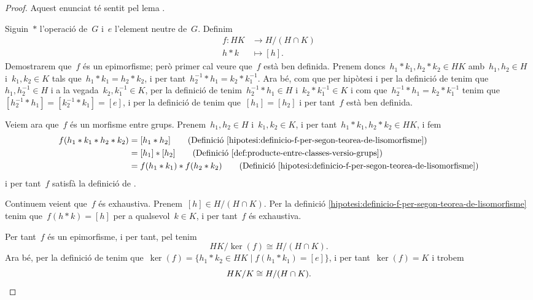 \documentclass[../../main.tex]{subfiles}
\begin{document}
    \begin{proof}
        Aquest enunciat té sentit pel lema .

        Siguin~\(\ast\) l'operació de~\(G\) i~\(e\) l'element neutre de~\(G\).
        Definim
        \begin{align}\label{hipotesi:definicio-f-per-segon-teorea-de-lisomorfisme}
        f\colon HK&\longrightarrow H/(H\cap K)\\
        h\ast k&\longmapsto [h].\nonumber
        \end{align}
        Demostrarem que~\(f\) és un epimorfisme; però primer cal veure que~\(f\) està ben definida.
        Prenem doncs~\(h_{1}\ast k_{1},h_{2}\ast k_{2}\in HK\) amb~\(h_{1},h_{2}\in H\) i~\(k_{1},k_{2}\in K\) tals que~\(h_{1}\ast k_{1}=h_{2}\ast k_{2}\), i per tant~\(h_{2}^{-1}\ast h_{1}=k_{2}\ast k_{1}^{-1}\).
        Ara bé, com que per hipòtesi i per la definició de  tenim que~\(h_{1},h_{2}^{-1}\in H\) i a la vegada~\(k_{2},k_{1}^{-1}\in K\), per la definició de  tenim~\(h_{2}^{-1}\ast h_{1}\in H\) i~\(k_{2}\ast k_{1}^{-1}\in K\) i com que~\(h_{2}^{-1}\ast h_{1}=k_{2}\ast k_{1}^{-1}\) tenim que~\([h_{2}^{-1}\ast h_{1}]=[k_{2}^{-1}\ast k_{1}]=[e]\), i per la definició de  %
        tenim que~\([h_{1}]=[h_{2}]\) i per tant~\(f\) està ben definida.

        Veiem ara que~\(f\) és un morfisme entre grups.
        Prenem~\(h_{1},h_{2}\in H\) i~\(k_{1},k_{2}\in K\), i per tant~\(h_{1}\ast k_{1},h_{2}\ast k_{2}\in HK\), i fem
        \begin{align*}
        f(h_{1}\ast k_{1}\ast h_{2}\ast k_{2})&=[h_{1}\ast h_{2}]\tag{Definició \eqref{hipotesi:definicio-f-per-segon-teorea-de-lisomorfisme}}\\
        &=[h_{1}]\ast[h_{2}]\tag{Definició \eqref{def:producte-entre-classes-versio-grups}}\\
        &=f(h_{1}\ast k_{1})\ast f(h_{2}\ast k_{2})\tag{Definició \eqref{hipotesi:definicio-f-per-segon-teorea-de-lisomorfisme}}
        \end{align*}
        i per tant~\(f\) satisfà la definició de .

        Continuem veient que~\(f\) és exhaustiva.
        Prenem~\([h]\in H/(H\cap K)\).
        Per la definició \eqref{hipotesi:definicio-f-per-segon-teorea-de-lisomorfisme} tenim que~\(f(h\ast k)=[h]\) per a qualsevol~\(k\in K\), i per tant~\(f\) és exhaustiva.

        Per tant~\(f\) és un epimorfisme, i per tant, pel  tenim
        \[
            HK/\ker(f)\cong H/(H\cap K).
        \]
        Ara bé, per la definició de  tenim que~\(\ker(f)=\{h_{1}\ast k_{2}\in HK\mid f(h_{1}\ast k_{1})=[e]\}\), i per tant~\(\ker(f)=K\) i trobem
        \[
            HK/K\cong H/(H\cap K).\qedhere
        \]
    \end{proof}
\end{document}
